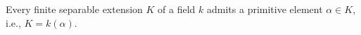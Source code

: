 Every finite separable extension $K$ of a field $k$ admits a primitive element $\alpha \in K$, i.e., $K = k(\alpha)$.
